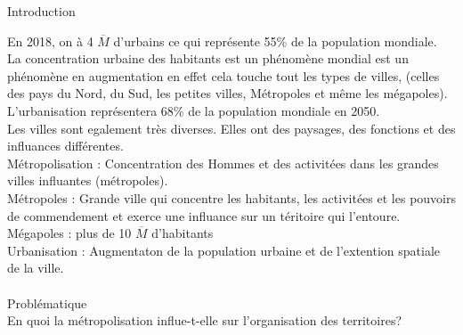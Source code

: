 \documentclass[12pt,a4paper]{article}
\begin{document}
\begin{center}
        \shadowbox{\begin{large}
                \textcolor{black}{La metropolisation un processus mondial differencie}
        \end{large}}
    \end{center}
    \vspace{0.5 cm}
Introduction \\ \par
{}
	En 2018, on à 4 $\overline{M}$ d'urbains ce qui représente 55\% de la population mondiale.\\
	La concentration urbaine des habitants est un phénomène mondial est un phénomène en augmentation en effet cela touche tout les types de villes, (celles des pays du Nord, du Sud, les petites villes, Métropoles et même les mégapoles).\\
	L'urbanisation représentera 68\% de la population mondiale en 2050.\\
	Les villes sont egalement très diverses. Elles ont des paysages, des fonctions et des influances différentes.\\

Métropolisation : Concentration des Hommes et des activitées dans les grandes villes influantes (métropoles).\\
Métropoles : Grande ville qui concentre les habitants, les activitées et les pouvoirs de commendement et exerce une influance sur un téritoire qui l'entoure.\\
Mégapoles : plus de 10 $\overline{M}$ d'habitants\\
Urbanisation : Augmentaton de la population urbaine et de l'extention spatiale de la ville.\\\\

 Problématique \\
\textcolor{greeen}{En quoi la métropolisation influe-t-elle sur l'organisation des territoires?}\\
\end{document}
